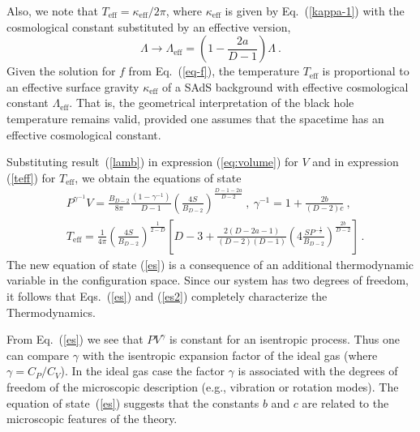 \documentclass[prd,onecolumn,notitlepage,amsmath,nofootinbib,superscriptaddress,showpacs,showkeys]{revtex4-1}
\begin{document}
Also, we note that $T_{\mathrm{eff}}=\kappa_{\mathrm{eff}}/2\pi$,
where $\kappa_{\mathrm{eff}}$ is given by Eq.~(\ref{kappa-1}) with
the cosmological constant substituted by an effective version, 
\begin{equation}
\Lambda\rightarrow\Lambda_{\mathrm{eff}}=\left(1-\frac{2a}{D-1}\right)\Lambda~.
\end{equation}
%
Given the solution for $f$ from Eq.~(\ref{eq-f}),
%
the temperature
$T_{\mathrm{eff}}$ is proportional to an effective surface gravity
$\kappa_{\mathrm{eff}}$ of a SAdS background with effective cosmological
constant $\Lambda_{\mathrm{eff}}$. That is, the geometrical interpretation
of the black hole temperature remains valid, provided one assumes
that the spacetime has an effective cosmological constant. 

Substituting result~(\ref{lamb}) in expression (\ref{eq:volume})
for $V$ and in expression (\ref{teff}) for $T_{\mathrm{eff}}$,
we obtain the equations of state 
\begin{align}
 & P^{\gamma^{-1}}V=\frac{B_{D-2}}{8\pi}\frac{\left(1-\gamma^{-1}\right)}{D-1}\left(\frac{4S}{B_{D-2}}\right)^{\frac{D-1-2a}{D-2}}~,\ \gamma^{-1}=1+\frac{2b}{\left(D-2\right)c}~,\label{es}\\
 & T_{\mathrm{eff}}=\frac{1}{4\pi}\left(\frac{4S}{B_{D-2}}\right)^{\frac{1}{2-D}}\left[D-3+\frac{2\left(D-2a-1\right)}{\left(D-2\right)\left(D-1\right)}\left(4\frac{SP^{-\frac{1}{c}}}{B_{D-2}}\right)^{\frac{2b}{D-2}}\right]\,.\label{es2}
\end{align}
The new equation of state (\ref{es}) is a consequence of an additional
thermodynamic variable in the configuration space. Since our system
has two degrees of freedom, it follows that Eqs.~(\ref{es}) and
(\ref{es2}) completely characterize the Thermodynamics.

From Eq.~(\ref{es}) we see that $PV^{\gamma}$ is constant for an
isentropic process. Thus one can compare $\gamma$ with the isentropic
expansion factor of the ideal gas (where $\gamma=C_{P}/C_{V}$). In
the ideal gas case the factor $\gamma$ is associated with the degrees
of freedom of the microscopic description (e.g., vibration or rotation
modes). The equation of state~(\ref{es}) suggests that the constants
$b$ and $c$ are related to the microscopic features of the theory.
\end{document}
